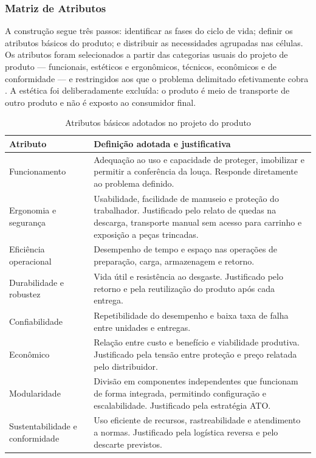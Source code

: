 \subsubsection{Matriz de Atributos}

A construção segue três passos: identificar as fases do ciclo de vida; definir os atributos básicos do produto; e distribuir as necessidades agrupadas nas células. Os atributos foram selecionados a partir das categorias usuais do projeto de produto --- funcionais, estéticos e ergonômicos, técnicos, econômicos e de conformidade --- e restringidos aos que o problema delimitado efetivamente cobra \citep{back2008}. A estética foi deliberadamente excluída: o produto é meio de transporte de outro produto e não é exposto ao consumidor final.

\begin{table}[H]
\caption{Atributos básicos adotados no projeto do produto}
\label{tab:atributos-definicao}
\centering
\footnotesize
\begin{tabularx}{\textwidth}{@{}L{3.3cm}@{\hspace{0.4cm}}Y@{}}
\toprule
\textbf{Atributo} & \textbf{Definição adotada e justificativa} \\
\midrule
Funcionamento & Adequação ao uso e capacidade de proteger, imobilizar e permitir a conferência da louça. Responde diretamente ao problema definido. \\
Ergonomia e segurança & Usabilidade, facilidade de manuseio e proteção do trabalhador. Justificado pelo relato de quedas na descarga, transporte manual sem acesso para carrinho e exposição a peças trincadas. \\
Eficiência operacional & Desempenho de tempo e espaço nas operações de preparação, carga, armazenagem e retorno. \\
Durabilidade e robustez & Vida útil e resistência ao desgaste. Justificado pelo retorno e pela reutilização do produto após cada entrega. \\
Confiabilidade & Repetibilidade do desempenho e baixa taxa de falha entre unidades e entregas. \\
Econômico & Relação entre custo e benefício e viabilidade produtiva. Justificado pela tensão entre proteção e preço relatada pelo distribuidor. \\
Modularidade & Divisão em componentes independentes que funcionam de forma integrada, permitindo configuração e escalabilidade. Justificado pela estratégia ATO. \\
Sustentabilidade e conformidade & Uso eficiente de recursos, rastreabilidade e atendimento a normas. Justificado pela logística reversa e pelo descarte previstos. \\
\bottomrule
\end{tabularx}
\end{table}


